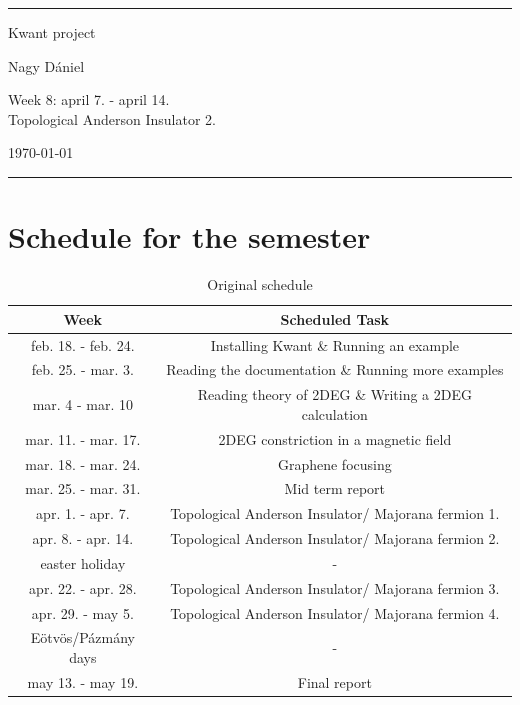 \documentclass[12pt]{article}
\numberwithin{equation}{section}
\begin{document}
\begin{center}

\thispagestyle{empty}

\rule{10 cm}{2pt}

\vspace{1.5cm}
{ \Large Kwant project}

\vspace{1.0cm}
Nagy Dániel

\vspace{0.5cm}
Week 8: april 7. - april 14. \\
Topological Anderson Insulator 2.

\vspace{0.5cm}
\today

\vspace{0.25cm}
\rule{10 cm}{2pt}

\end{center}
\newpage

\newpage
{}

\section{Schedule for the semester}
\begin{table}[ht]
  \centering
  \caption{Original schedule}
  \begin{tabular}{|c|c|}
  \hline
  Week & Scheduled Task \\ [0.5ex]  \hline %
  feb. 18. - feb. 24. & Installing Kwant \& Running an example \\ \hline
  feb. 25. - mar. 3. & Reading the documentation \& Running more examples \\ \hline
  mar. 4 - mar. 10 & Reading theory of 2DEG \& Writing a 2DEG calculation \\ \hline 
  mar. 11. - mar. 17. & 2DEG constriction in a magnetic field \\ \hline
  mar. 18. -  mar. 24. & Graphene focusing \\ \hline
  mar. 25. -  mar. 31. & Mid term report \\ \hline
  apr. 1. -  apr. 7. & Topological Anderson Insulator/ Majorana fermion 1. \\ \hline
  apr. 8. -  apr. 14. & Topological Anderson Insulator/ Majorana fermion 2. \\ \hline
  easter holiday & - \\ \hline
  apr. 22. - apr. 28. & Topological Anderson Insulator/ Majorana fermion 3. \\ \hline 
  apr. 29. - may 5. & Topological Anderson Insulator/ Majorana fermion 4. \\ \hline 
  Eötvös/Pázmány days & - \\ \hline
  may 13. - may 19. & Final report \\ \hline

  \end{tabular}
\end{table}
\end{document}

